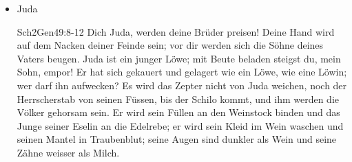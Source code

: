 \begin{enumerate}
\begin{itemize}
\begin{bibeltext}{Sch2}{Gen}{28:13-15}
            Und siehe, der \herr stand über ihr und sprach: Ich bin der \herr, der Gott deines Vaters Abraham und der Gott Isaak; das Land auf dem du liegst, will ich dir und deinem Samen geben. Und dein Same soll werden der Staub der Erde, und nach Westen, Osten, Norden und Süden sollst du dich ausbreiten; und dir und in deinem Samen sollen gesegnet werden alle Geschlechter der Erde! Und siehe, ich bin mit dir, und ich will dich behüten überall, wo du hinziehst, und dich wieder in dieses Land bringen. Denn ich will dich nicht verlassen, bis ich vollbracht habe, was ich dir zugesagt habe!
        \end{bibeltext}
        \begin{bibeltext}{Sch2}{Gen}{35:9-10}
            Und Gott erschien Jakob zum zweiten Mal, seit er aus Paddan-Aram gekommen war, und segnete ihn. Und Gott sprach: Dein Name ist Jakob, aber du sollst nicht mehr Jakob heissen, sondern Israel soll dein Name sein! Und so gab er ihm den Namen Israel!
        \end{bibeltext}
        \item Juda
        \begin{bibeltext}{Sch2}{Gen}{49:8-12}
            Dich Juda, werden deine Brüder preisen! Deine Hand wird auf dem Nacken deiner Feinde sein; vor dir werden sich die Söhne deines Vaters beugen. Juda ist ein junger Löwe; mit Beute beladen steigst du, mein Sohn, empor! Er hat sich gekauert und gelagert wie ein Löwe, wie eine Löwin; wer darf ihn aufwecken? Es wird das Zepter nicht von Juda weichen, noch der Herrscherstab von seinen Füssen, bis der Schilo kommt, und ihm werden die Völker gehorsam sein. Er wird sein Füllen an den Weinstock binden und das Junge seiner Eselin an die Edelrebe; er wird sein Kleid im Wein waschen und seinen Mantel in Traubenblut; seine Augen sind dunkler als Wein und seine Zähne weisser als Milch.
        \end{bibeltext}
    \end{itemize}
\end{enumerate}